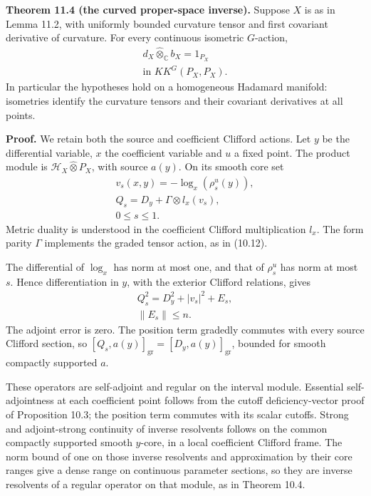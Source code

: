 \documentclass[
  11pt,
]{article}
\begin{document}
\textbf{Theorem 11.4 (the curved proper-space inverse).} Suppose \(X\)
is as in Lemma 11.2, with uniformly bounded curvature tensor and first
covariant derivative of curvature. For every continuous isometric
\(G\)-action, \[
\begin{gathered}
d_X\widehat\otimes_{\mathbb C}b_X=1_{P_X}\\
\text{in }KK^G(P_X,P_X).
\end{gathered}
\tag{11.23}
\] In particular the hypotheses hold on a homogeneous Hadamard manifold:
isometries identify the curvature tensors and their covariant
derivatives at all points.

\textbf{Proof.} We retain both the source and coefficient Clifford
actions. Let \(y\) be the differential variable, \(x\) the coefficient
variable and \(u\) a fixed point. The product module is
\(\mathcal H_X\widehat\otimes P_X\), with source \(a(y)\). On its smooth
core set \[
\begin{gathered}
v_s(x,y)=-\log_x(\rho_s^u(y)),\\
Q_s=D_y+\Gamma\otimes l_x(v_s),\\
0\leq s\leq1.
\end{gathered}
\tag{11.24}
\] Metric duality is understood in the coefficient Clifford
multiplication \(l_x\). The form parity \(\Gamma\) implements the graded
tensor action, as in (10.12).

The differential of \(\log_x\) has norm at most one, and that of
\(\rho_s^u\) has norm at most \(s\). Hence differentiation in \(y\),
with the exterior Clifford relations, gives \[
\begin{gathered}
Q_s^2=D_y^2+|v_s|^2+E_s,\\
\|E_s\|\leq n.
\end{gathered}
\tag{11.25}
\] The adjoint error is zero. The position term gradedly commutes with
every source Clifford section, so
\([Q_s,a(y)]_{\mathrm{gr}}=[D_y,a(y)]_{\mathrm{gr}}\), bounded for
smooth compactly supported \(a\).

These operators are self-adjoint and regular on the interval module.
Essential self-adjointness at each coefficient point follows from the
cutoff deficiency-vector proof of Proposition 10.3; the position term
commutes with its scalar cutoffs. Strong and adjoint-strong continuity
of inverse resolvents follows on the common compactly supported smooth
\(y\)-core, in a local coefficient Clifford frame. The norm bound of one
on those inverse resolvents and approximation by their core ranges give
a dense range on continuous parameter sections, so they are inverse
resolvents of a regular operator on that module, as in Theorem 10.4.
\end{document}
